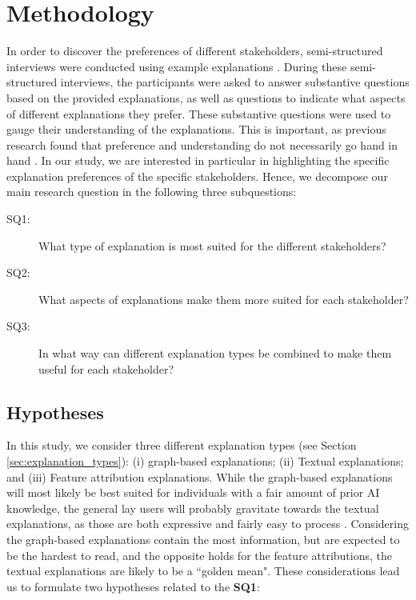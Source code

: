 \section{Methodology}

In order to discover the preferences of different stakeholders, semi-structured interviews were conducted using example explanations \cite{garcia2018mixed}. During these semi-structured interviews, the participants were asked to answer substantive questions based on the provided explanations, as well as questions to indicate what aspects of different explanations they prefer. These substantive questions were used to gauge their understanding of the explanations. This is important, as previous research found that preference and understanding do not necessarily go hand in hand \cite{szymanski2021visual}. In our study, we are interested in particular in highlighting the specific explanation preferences of the specific stakeholders. Hence, we decompose our main research question in the following three subquestions:

\begin{description}
    \item[SQ1:] What type of explanation is most suited for the different stakeholders?
    \item[SQ2:] What aspects of explanations make them more suited for each stakeholder?
    \item[SQ3:] In what way can different explanation types be combined to make them useful for each stakeholder?
\end{description}


\subsection{Hypotheses}

In this study, we consider three different explanation types (see Section \ref{sec:explanation_types}): (i) graph-based explanations; (ii) Textual explanations; and (iii) Feature attribution explanations. While the graph-based explanations will most likely be best suited for individuals with a fair amount of prior AI knowledge, the general lay users will probably gravitate towards the textual explanations, as those are both expressive and fairly easy to process \cite{purificato2021evaluating}. Considering the graph-based explanations contain the most information, but are expected to be the hardest to read, and the opposite holds for the feature attributions, the textual explanations are likely to be a ``golden mean". These considerations lead us to formulate two hypotheses related to the \textbf{SQ1}:

